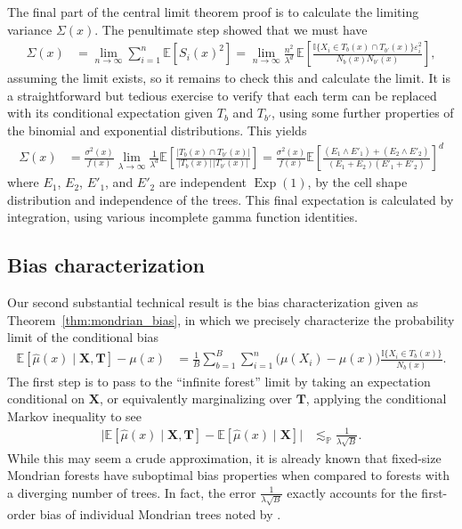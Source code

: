 \documentclass[11pt,lof]{puthesis}
\renewcommand{\P}{\ensuremath{\mathbb{P}}}
\newcommand{\E}{\ensuremath{\mathbb{E}}}
\newcommand{\I}{\ensuremath{\mathbb{I}}}
\newcommand{\bX}{\ensuremath{\mathbf{X}}}
\newcommand{\bT}{\ensuremath{\mathbf{T}}}
\DeclareMathOperator{\Exp}{Exp}
\theoremstyle{break}
\theoremstyle{proof}
\begin{document}
The final part of the central limit theorem proof is to calculate the limiting
variance $\Sigma(x)$. The penultimate step showed that we must have
%
\begin{align*}
\Sigma(x)
&= \lim_{n \to \infty} \sum_{i=1}^n \E \left[S_i(x)^2 \right]
= \lim_{n \to \infty}
\frac{n^2}{\lambda^d} \,
\E \left[
\frac{\I\{X_i \in T_b(x) \cap T_{b'}(x)\} \varepsilon_i^2}
{N_{b}(x) N_{b'}(x)}
\right],
\end{align*}
%
assuming the limit exists, so it remains to check this and calculate the limit.
It is a straightforward but tedious exercise to verify that each term can be
replaced with its conditional expectation given $T_b$ and $T_{b'}$, using some
further properties of the binomial and exponential distributions. This yields
%
\begin{align*}
\Sigma(x)
&=
\frac{\sigma^2(x)}{f(x)}
\lim_{\lambda \to \infty}
\frac{1}{\lambda^d}
\E \left[
\frac{|T_{b}(x) \cap T_{b'}(x)|}
{|T_{b}(x)| \, |T_{b'}(x)|}
\right]
= \frac{\sigma^2(x)}{f(x)}
\E \left[
\frac{(E_{1} \wedge E'_{1}) + (E_{2} \wedge E'_{2})}
{(E_{1} + E_{2}) (E'_{1} + E'_{2})}
\right]^d
\end{align*}
%
where $E_1$, $E_2$, $E'_1$, and $E'_2$ are independent $\Exp(1)$,
by the cell shape distribution and independence of the trees. This final
expectation is calculated by integration, using various incomplete gamma
function identities.

\subsection*{Bias characterization}

Our second substantial technical result is the bias characterization
given as Theorem~\ref{thm:mondrian_bias}, in which we precisely
characterize the probability limit of the conditional bias
%
\begin{align*}
\E \left[ \hat \mu(x) \mid \bX, \bT \right]
- \mu(x)
&=
\frac{1}{B} \sum_{b=1}^B
\sum_{i=1}^n \big( \mu(X_i) - \mu(x) \big)
\frac{\I\{X_i \in T_b(x)\}}{N_b(x)}.
\end{align*}
%
The first step is to pass to the ``infinite forest''
limit by taking an expectation conditional on $\bX$, or equivalently
marginalizing over $\bT$, applying the conditional Markov inequality
to see
%
\begin{align*}
\big|
\E \left[ \hat \mu(x) \mid \bX, \bT \right]
- \E \left[ \hat \mu(x) \mid \bX \right]
\big|
&\lesssim_\P
\frac{1}{\lambda \sqrt B}.
\end{align*}
%
While this may seem a crude approximation, it is already known that fixed-size
Mondrian forests have suboptimal bias properties when compared to forests with
a diverging number of trees. In fact, the error $\frac{1}{\lambda \sqrt B}$
exactly accounts for the first-order bias of individual Mondrian trees noted by
\citet{mourtada2020minimax}.
\end{document}
